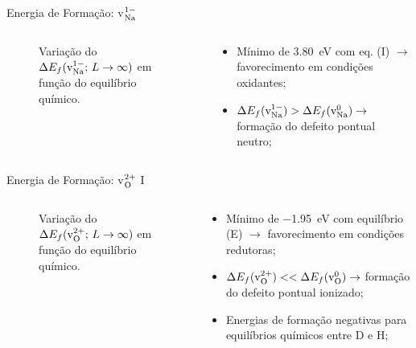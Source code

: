 \begin{frame}{Energia de Formação: \texorpdfstring{v$_{\ce{Na}}^{1-}$}{vNa1-}}
	\begin{columns}
		\begin{column}{.5\textwidth}
			\begin{figure}[t]
				\centering
				
				\caption{Variação do $\Delta E_f (\text{v}_{\ce{Na}}^{1-};\, L \to \infty)$ em função do equilíbrio químico.\label{fig:energy_vac_na1}}
			\end{figure}
		\end{column}
		\begin{column}{.5\textwidth}
			\begin{itemize}
				\item Mínimo de \SI{3.80}{\electronvolt} com eq.  (I) $\to$ favorecimento em condições oxidantes;
				\item $\Delta E_f (\text{v}_{\ce{Na}}^{1-}) > \Delta E_f (\text{v}_{\ce{Na}}^{0}) \to$ formação do defeito pontual neutro;
			\end{itemize}
		\end{column}
	\end{columns}
\end{frame}
\begin{frame}{Energia de Formação: \texorpdfstring{v$_{\ce{O}}^{2+}$}{vO2+} I}
	\begin{columns}
		\begin{column}{.5\textwidth}
			\begin{figure}[t]
				\centering
				
				\caption{Variação do $\Delta E_f (\text{v}_{\ce{O}}^{2+};\, L \to \infty)$ em função do equilíbrio químico.\label{fig:energy_vac_o2}}
			\end{figure}
		\end{column}
		\begin{column}{.5\textwidth}
			\begin{itemize}
				\item Mínimo de \SI{-1.95}{\electronvolt} com equilíbrio  (E) $\to$ favorecimento em condições redutoras;
				\item $\Delta E_f (\text{v}_{\ce{O}}^{2+}) << \Delta E_f (\text{v}_{\ce{O}}^{0}) \to$ formação do defeito pontual ionizado;
				\item \alert{Energias de formação negativas para equilíbrios químicos entre D e H;}
			\end{itemize}
		\end{column}
	\end{columns}
\end{frame}
